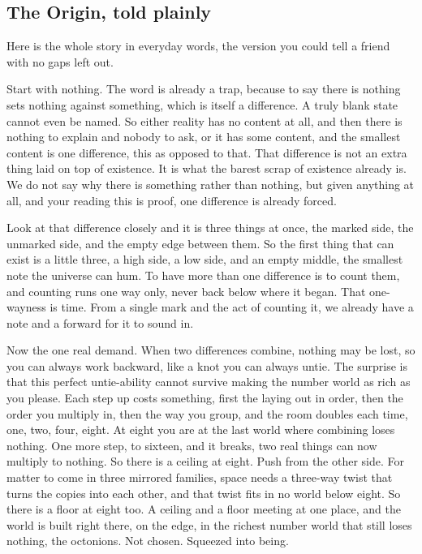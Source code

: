 \subsection{The Origin, told plainly}

Here is the whole story in everyday words, the version you could tell a friend with no gaps left out.

Start with nothing. The word is already a trap, because to say there is nothing sets nothing against something, which is
itself a difference. A truly blank state cannot even be named. So either reality has no content at all, and then there
is nothing to explain and nobody to ask, or it has some content, and the smallest content is one difference, this as
opposed to that. That difference is not an extra thing laid on top of existence. It is what the barest scrap of
existence already is. We do not say why there is something rather than nothing, but given anything at all, and your
reading this is proof, one difference is already forced.

Look at that difference closely and it is three things at once, the marked side, the unmarked side, and the empty edge
between them. So the first thing that can exist is a little three, a high side, a low side, and an empty middle, the
smallest note the universe can hum. To have more than one difference is to count them, and counting runs one way only,
never back below where it began. That one-wayness is time. From a single mark and the act of counting it, we already
have a note and a forward for it to sound in.

Now the one real demand. When two differences combine, nothing may be lost, so you can always work backward, like a knot
you can always untie. The surprise is that this perfect untie-ability cannot survive making the number world as rich as
you please. Each step up costs something, first the laying out in order, then the order you multiply in, then the way
you group, and the room doubles each time, one, two, four, eight. At eight you are at the last world where combining
loses nothing. One more step, to sixteen, and it breaks, two real things can now multiply to nothing. So there is a
ceiling at eight. Push from the other side. For matter to come in three mirrored families, space needs a three-way twist
that turns the copies into each other, and that twist fits in no world below eight. So there is a floor at eight too. A
ceiling and a floor meeting at one place, and the world is built right there, on the edge, in the richest number world
that still loses nothing, the octonions. Not chosen. Squeezed into being.

